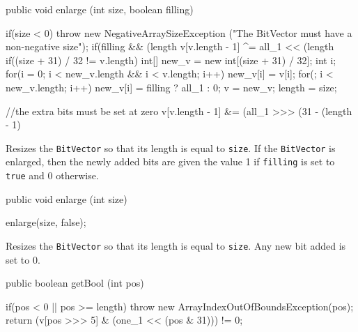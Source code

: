 \begin{code}

   public void enlarge (int size, boolean filling) \begin{hide} {
      if(size < 0)
         throw new NegativeArraySizeException
         ("The BitVector must have a non-negative size");
      if(filling && (length %
         v[v.length - 1] ^= all_1 << (length %
      if((size + 31) / 32 != v.length) {
         int[] new_v = new int[(size + 31) / 32];
         int i;
         for(i = 0; i < new_v.length && i < v.length; i++)
            new_v[i] = v[i];
         for(; i < new_v.length; i++)
            new_v[i] = filling ? all_1 : 0;
         v = new_v;
      }
      length = size;

      //the extra bits must be set at zero
      v[v.length - 1] &= (all_1 >>> (31 - (length - 1) %
   } \end{hide}
\end{code}
\begin{tabb} Resizes the \texttt{BitVector} so that its length is equal
  to \texttt{size}. If the \texttt{BitVector} is enlarged, then the newly 
  added bits are given the value 1 if \texttt{filling} is set to 
  \texttt{true} and 0 otherwise.
\end{tabb}
\begin{htmlonly}
\end{htmlonly}
\begin{code}

   public void enlarge (int size) \begin{hide} {
      enlarge(size, false);
   } \end{hide}
\end{code}
\begin{tabb} Resizes the \texttt{BitVector} so that its length is equal
  to \texttt{size}. Any new bit added is set to 0.
\end{tabb}
\begin{htmlonly}
\end{htmlonly}
\begin{code}

   public boolean getBool (int pos) \begin{hide} {
      if(pos < 0 || pos >= length)
         throw new ArrayIndexOutOfBoundsException(pos);
      return (v[pos >>> 5] & (one_1 << (pos & 31))) != 0;
   } \end{hide}
\end{code}
